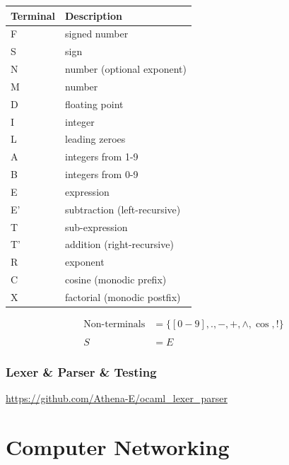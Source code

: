 \documentclass[a4paper, 12pt, oneside]{book}
\begin{document}
\begin{center}
  \begin{tabular}{|l|l|}
    \hline
    \textbf{Terminal} & \textbf{Description}         \\
    \hline
    F                 & signed number                \\
    \hline
    S                 & sign                         \\
    \hline
    N                 & number (optional exponent)   \\
    \hline
    M                 & number                       \\
    \hline
    D                 & floating point               \\
    \hline
    I                 & integer                      \\
    \hline
    L                 & leading zeroes               \\
    \hline
    A                 & integers from 1-9            \\
    \hline
    B                 & integers from 0-9            \\
    \hline
    E                 & expression                   \\
    \hline
    E'                & subtraction (left-recursive) \\
    \hline
    T                 & sub-expression               \\
    \hline
    T'                & addition (right-recursive)   \\
    \hline
    R                 & exponent                     \\
    \hline
    C                 & cosine (monodic prefix)      \\
    \hline
    X                 & factorial (monodic postfix)  \\
    \hline
  \end{tabular}
\end{center}

\begin{align*}
  \text{Non-terminals} & = \{[0-9],., -, +, \wedge, \cos, !\} \\
  \\
  S                    & = E
\end{align*}

\subsection{Lexer \& Parser \& Testing}

\url{https://github.com/Athena-E/ocaml_lexer_parser}


\chapter{Computer Networking}
\end{document}
